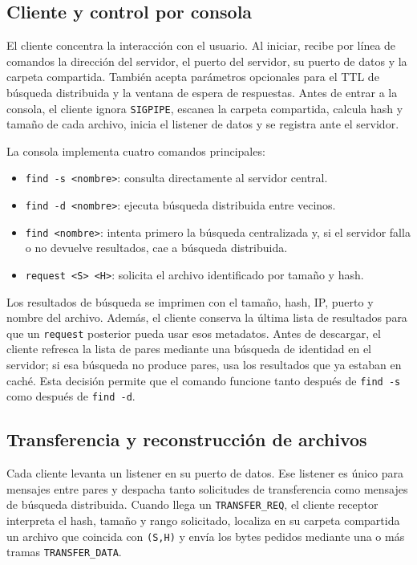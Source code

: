 \documentclass[12pt]{article}
\begin{document}
\subsection{Cliente y control por consola}

El cliente concentra la interacción con el usuario. Al iniciar, recibe por
línea de comandos la dirección del servidor, el puerto del servidor, su puerto
de datos y la carpeta compartida. También acepta parámetros opcionales para el
TTL de búsqueda distribuida y la ventana de espera de respuestas. Antes de
entrar a la consola, el cliente ignora \texttt{SIGPIPE}, escanea la carpeta
compartida, calcula hash y tamaño de cada archivo, inicia el listener de datos
y se registra ante el servidor.

La consola implementa cuatro comandos principales:

\begin{itemize}
    \item \verb|find -s <nombre>|: consulta directamente al servidor central.
    \item \verb|find -d <nombre>|: ejecuta búsqueda distribuida entre vecinos.
    \item \verb|find <nombre>|: intenta primero la búsqueda centralizada y,
    si el servidor falla o no devuelve resultados, cae a búsqueda distribuida.
    \item \verb|request <S> <H>|: solicita el archivo identificado por tamaño
    y hash.
\end{itemize}

Los resultados de búsqueda se imprimen con el tamaño, hash, IP, puerto y nombre
del archivo. Además, el cliente conserva la última lista de resultados para que
un \texttt{request} posterior pueda usar esos metadatos. Antes de descargar, el
cliente refresca la lista de pares mediante una búsqueda de identidad en el
servidor; si esa búsqueda no produce pares, usa los resultados que ya estaban
en caché. Esta decisión permite que el comando funcione tanto después de
\verb|find -s| como después de \verb|find -d|.

\subsection{Transferencia y reconstrucción de archivos}

Cada cliente levanta un listener en su puerto de datos. Ese listener es único
para mensajes entre pares y despacha tanto solicitudes de transferencia como
mensajes de búsqueda distribuida. Cuando llega un \texttt{TRANSFER\_REQ}, el
cliente receptor interpreta el hash, tamaño y rango solicitado, localiza en su
carpeta compartida un archivo que coincida con \texttt{(S,H)} y envía los bytes
pedidos mediante una o más tramas \texttt{TRANSFER\_DATA}.
\end{document}
